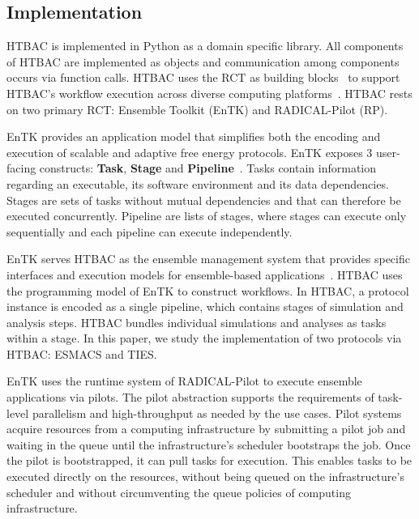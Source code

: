 \subsection{Implementation}

HTBAC is implemented in Python as a domain specific library. All components
of HTBAC are implemented as objects and communication among components occurs
via function calls. HTBAC uses the RCT as building
blocks~\cite{review_bb_2016} to support HTBAC's workflow execution across
diverse computing platforms~\cite{turilli2017comprehensive}. HTBAC rests on
two primary RCT: Ensemble Toolkit (EnTK) and RADICAL-Pilot (RP).

EnTK provides an application model that simplifies both the encoding and
execution of scalable and adaptive free energy protocols. EnTK exposes 3
user-facing constructs: \textbf{Task}, \textbf{Stage} and
\textbf{Pipeline}~\cite{power-of-many17}. Tasks contain information regarding
an executable, its software environment and its data dependencies. Stages are
sets of tasks without mutual dependencies and that can therefore be executed
concurrently. Pipeline are lists of stages, where stages can execute only
sequentially and each pipeline can execute independently.

EnTK serves HTBAC as the ensemble management system that provides specific
interfaces and execution models for ensemble-based
applications~\cite{power-of-many17}. HTBAC uses the programming model of EnTK
to construct workflows. In HTBAC, a protocol instance is encoded as a single
pipeline, which contains stages of simulation and analysis steps. HTBAC
bundles individual simulations and analyses as tasks within a stage. In this
paper, we study the implementation of two protocols via HTBAC: ESMACS and
TIES.

EnTK uses the runtime system of RADICAL-Pilot to execute ensemble
applications via pilots. The pilot abstraction supports the requirements of
task-level parallelism and high-throughput as needed by the use cases. Pilot
systems acquire resources from a computing infrastructure by submitting a
pilot job and waiting in the queue until the infrastructure's scheduler
bootstraps the job. Once the pilot is bootstrapped, it can pull tasks for
execution. This enables tasks to be executed directly on the resources,
without being queued on the infrastructure's scheduler and without
circumventing the queue policies of computing infrastructure.

